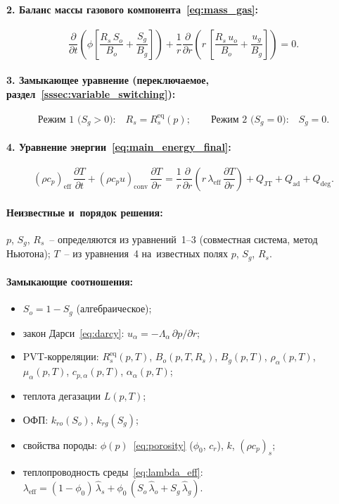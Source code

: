 \documentclass[12pt,a4paper]{article}
\newcommand{\divr}[1]{\frac{1}{r}\frac{\partial}{\partial r}\!\left(r\,#1\right)}
\newcommand{\pdt}[1]{\frac{\partial #1}{\partial t}}
\newcommand{\pdr}[1]{\frac{\partial #1}{\partial r}}
\newcommand{\rhocpeff}{(\rho c_p)_{\mathrm{eff}}}
\newcommand{\rhocpconv}{(\rho c_p u)_{\mathrm{conv}}}
\newcommand{\leff}{\lambda_{\mathrm{eff}}}
\newcommand{\QJT}{Q_{\mathrm{JT}}}
\newcommand{\Qad}{Q_{\mathrm{ad}}}
\newcommand{\Qdeg}{Q_{\mathrm{deg}}}
\begin{document}
\paragraph{2. Баланс массы газового компонента~\eqref{eq:mass_gas}:}
\[
  \pdt{}\!\left(\phi\!\left[
    \frac{R_s\,S_o}{B_o} + \frac{S_g}{B_g}
  \right]\right)
  + \divr{\left[
    \frac{R_s\,u_o}{B_o} + \frac{u_g}{B_g}
  \right]} = 0.
\]

\paragraph{3. Замыкающее уравнение (переключаемое,
раздел~\ref{sssec:variable_switching}):}
\[
  \text{Режим~1 ($S_g > 0$):}\quad R_s = R_s^{\text{eq}}(p);
  \qquad
  \text{Режим~2 ($S_g = 0$):}\quad S_g = 0.
\]

\paragraph{4. Уравнение энергии~\eqref{eq:main_energy_final}:}
\[
  \rhocpeff\,\pdt{T}
  + \rhocpconv\,\pdr{T}
  = \divr{\leff\,\pdr{T}}
  + \QJT + \Qad + \Qdeg.
\]

\paragraph{Неизвестные и~порядок решения:}
$p$, $S_g$, $R_s$~-- определяются из уравнений~1--3
(совместная система, метод Ньютона);
$T$~-- из уравнения~4 на~известных полях $p$, $S_g$, $R_s$.

\paragraph{Замыкающие соотношения:}
\begin{itemize}[nosep]
  \item $S_o = 1 - S_g$ (алгебраическое);
  \item закон Дарси~\eqref{eq:darcy}:
        $u_\alpha = -\Lambda_\alpha\,\partial p/\partial r$;
  \item PVT-корреляции: $R_s^{\text{eq}}(p,T)$, $B_o(p,T,R_s)$,
        $B_g(p,T)$, $\rho_\alpha(p,T)$, $\mu_\alpha(p,T)$,
        $c_{p,\alpha}(p,T)$, $\alpha_\alpha(p,T)$;
  \item теплота дегазации $L(p,T)$;
  \item ОФП: $k_{ro}(S_o)$, $k_{rg}(S_g)$;
  \item свойства породы: $\phi(p)$~\eqref{eq:porosity} ($\phi_0$, $c_r$), $k$, $(\rho c_p)_s$;
  \item теплопроводность среды~\eqref{eq:lambda_eff}:
        $\leff = (1{-}\phi_0)\,\hat\lambda_s
        + \phi_0\,(S_o\,\hat\lambda_o + S_g\,\hat\lambda_g)$.
\end{itemize}
\end{document}

